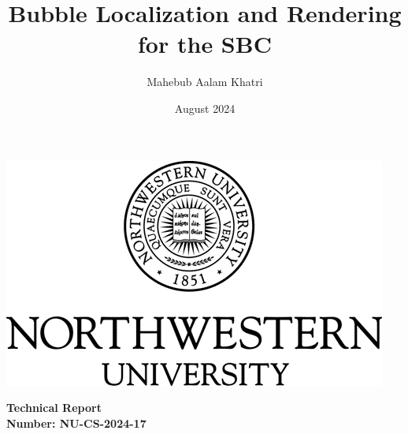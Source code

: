 \documentclass[11pt, letterpaper]{extarticle} %
\title{Bubble Localization and Rendering for the SBC}
\author{Mahebub Aalam Khatri}
\date{August 2024}
\begin{document}
\begin{titlingpage} %
\begin{center}
\includegraphics[width=0.5\linewidth]{nucs_logo.png}\\ %
\begin{Large}
    \vspace{0.5in}
    \textbf{Technical Report}\\
    \textbf{Number: NU-CS-2024-17}\\
    \vspace{0.1in}
    \thedate\\
\end{Large}
\vspace{0.5in} %
\begin{Large} 
    \textbf{\thetitle} \\
    \theauthor\\
\end{Large}
\end{center}

\vspace{0.2cm}


\end{titlingpage}
\end{document}
